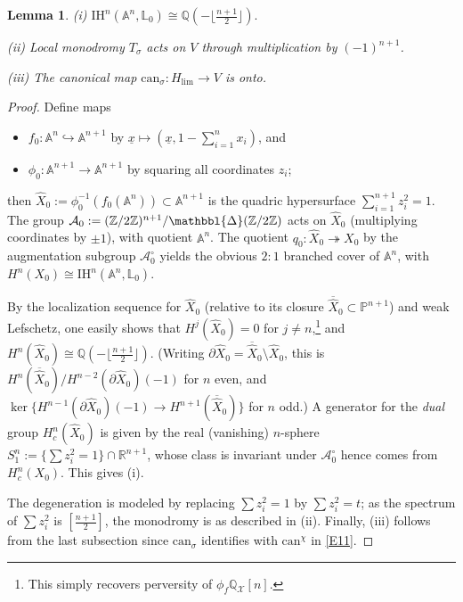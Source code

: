 \documentclass[12pt,letterpaper,english]{amsart}
\numberwithin{equation}{section}
\numberwithin{figure}{section}
\theoremstyle{plain}
\theoremstyle{remark}
\theoremstyle{definition}
\theoremstyle{definition}
\theoremstyle{plain}
\theoremstyle{plain}
\theoremstyle{plain}
\newtheorem{lem}[equation]{Lemma}
\theoremstyle{plain}
\theoremstyle{definition}
\def\d{\partial}
\def\ux{\underline{x}}
\def\QQ{\mathbb{Q}}
\def\RR{\mathbb{R}}
\def\ZZ{\mathbb{Z}}
\def\PP{\mathbb{P}}
\def\X{\mathcal{X}}
\def\A{\mathcal{A}}
\def\IH{\mathrm{IH}}
\def\NP{\mathbbl{\Delta}}
\def\LL{\mathbb{L}}
\def\NP{\mathbbl{\Delta}}
\def\can{\mathrm{can}}
\def\sm{\setminus}
\theoremstyle{definition}
\begin{document}
\begin{lem}\label{E13}
\textup{(i)} $\IH^n(\mathbb{A}^n,\LL_0)\cong \QQ(-\lfloor\tfrac{n+1}{2}\rfloor).$

\textup{(ii)} Local monodromy $T_{\sigma}$ acts on $V$ through multiplication by $(-1)^{n+1}$.

\textup{(iii)} The canonical map $\can_{\sigma}\colon H_{\lim}\to V$ is onto.
\end{lem}
\begin{proof}
Define maps 
\begin{itemize}[leftmargin=0.5cm]
\item $f_0\colon \mathbb{A}^n\hookrightarrow \mathbb{A}^{n+1}$ by $\ux\mapsto (\ux,1-\sum_{i=1}^n x_i)$, and
\item $\phi_0\colon \mathbb{A}^{n+1}\to\mathbb{A}^{n+1}$ by squaring all coordinates $z_i$;
\end{itemize}
then $\hat{X}_0:=\phi_0^{-1}(f_0(\mathbb{A}^n))\subset \mathbb{A}^{n+1}$ is the quadric hypersurface $\sum_{i=1}^{n+1}z_i^2=1$. The group $\A_0:=(\ZZ/2\ZZ)^{n+1}/\NP(\ZZ/2\ZZ)$ acts on $\hat{X}_0$ (multiplying coordinates by $\pm1$), with quotient $\mathbb{A}^n$. The quotient $q_0\colon \hat{X}_0\twoheadrightarrow X_0$ by the augmentation subgroup $\A_0^{\circ}$ yields the obvious $2{:}1$ branched cover of $\mathbb{A}^n$, with $H^n(X_0)\cong \IH^n(\mathbb{A}^n,\LL_0)$.

By the localization sequence for $\hat{X}_0$ (relative to its closure $\overline{\hat{X}}_0\subset \PP^{n+1}$) and weak Lefschetz, one easily shows that $H^j(\hat{X}_0)=0$ for $j\neq n$,\footnote{This simply recovers perversity of $\phi_f\QQ_{\X}[n]$.} and $H^n(\hat{X}_0)\cong \QQ(-\lfloor\tfrac{n+1}{2}\rfloor)$. (Writing $\d\hat{X}_0=\overline{\hat{X}}_0\sm\hat{X}_0$, this is $H^n(\overline{\hat{X}}_0)/H^{n-2}(\d\hat{X}_0)(-1)$ for $n$ even, and $\ker\{H^{n-1}(\d\hat{X}_0)(-1)\to H^{n+1}(\overline{\hat{X}}_0)\}$ for $n$ odd.) A generator for the \emph{dual} group $H^n_c(\hat{X}_0)$ is given by the real (vanishing) $n$-sphere $S^n_1:=\{\sum z_i^2=1\}\cap \RR^{n+1}$, whose class is invariant under $\A_0^{\circ}$ hence comes from $H^n_c(X_0)$. This gives (i).

The degeneration is modeled by replacing $\sum z_i^2=1$ by $\sum z_i^2=t$; as the spectrum of $\sum z_i^2$ is $[\tfrac{n+1}{2}]$, the monodromy is as described in (ii). Finally, (iii) follows from the last subsection since $\can_{\sigma}$ identifies with $\can^{\chi}$ in \eqref{E11}.
\end{proof}
\end{document}
